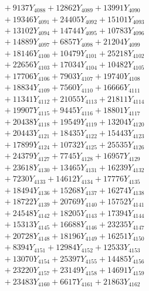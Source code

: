 \documentclass[a4paper,10pt]{article}
\begin{document}
{\begin{align}
&\;  + 9137 Y_{4088} + 12862 Y_{4089} + 13991 Y_{4090} \\[0.3ex]
&\;  + 19346 Y_{4091} + 24405 Y_{4092} + 15101 Y_{4093} \\[0.3ex]
&\;  + 13102 Y_{4094} + 14744 Y_{4095} + 10783 Y_{4096} \\[0.3ex]
&\;  + 14889 Y_{4097} + 6857 Y_{4098} + 21204 Y_{4099} \\[0.3ex]
&\;  + 18146 Y_{4100} + 10479 Y_{4101} + 25218 Y_{4102} \\[0.3ex]
&\;  + 22656 Y_{4103} + 17034 Y_{4104} + 10482 Y_{4105} \\[0.3ex]
&\;  + 17706 Y_{4106} + 7903 Y_{4107} + 19740 Y_{4108} \\[0.5ex]\allowbreak
&\;  + 18834 Y_{4109} + 7560 Y_{4110} + 16666 Y_{4111} \\[0.3ex]
&\;  + 11341 Y_{4112} + 21055 Y_{4113} + 21811 Y_{4114} \\[0.3ex]
&\;  + 19907 Y_{4115} + 9445 Y_{4116} + 18801 Y_{4117} \\[0.3ex]
&\;  + 20438 Y_{4118} + 19549 Y_{4119} + 13204 Y_{4120} \\[0.3ex]
&\;  + 20443 Y_{4121} + 18435 Y_{4122} + 15443 Y_{4123} \\[0.3ex]
&\;  + 17899 Y_{4124} + 10732 Y_{4125} + 25535 Y_{4126} \\[0.3ex]
&\;  + 24379 Y_{4127} + 7745 Y_{4128} + 16957 Y_{4129} \\[0.3ex]
&\;  + 23618 Y_{4130} + 13465 Y_{4131} + 16239 Y_{4132} \\[0.3ex]
&\;  + 7230 Y_{4133} + 14612 Y_{4134} + 17776 Y_{4135} \\[0.3ex]
&\;  + 18494 Y_{4136} + 15268 Y_{4137} + 16274 Y_{4138} \\[0.5ex]\allowbreak
&\;  + 18722 Y_{4139} + 20769 Y_{4140} + 15752 Y_{4141} \\[0.3ex]
&\;  + 24548 Y_{4142} + 18205 Y_{4143} + 17394 Y_{4144} \\[0.3ex]
&\;  + 15313 Y_{4145} + 16688 Y_{4146} + 23235 Y_{4147} \\[0.3ex]
&\;  + 20728 Y_{4148} + 18196 Y_{4149} + 16251 Y_{4150} \\[0.3ex]
&\;  + 8394 Y_{4151} + 12984 Y_{4152} + 12533 Y_{4153} \\[0.3ex]
&\;  + 13070 Y_{4154} + 25397 Y_{4155} + 14485 Y_{4156} \\[0.3ex]
&\;  + 23220 Y_{4157} + 23149 Y_{4158} + 14691 Y_{4159} \\[0.3ex]
&\;  + 23483 Y_{4160} + 6617 Y_{4161} + 21863 Y_{4162} \\[0.3ex]

\end{align}}
\end{document}
